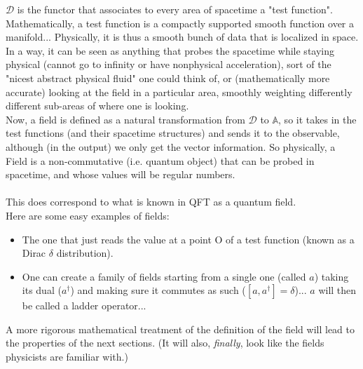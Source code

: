 \documentclass[a4paper,11pt]{article}
\numberwithin{equation}{section}
\theoremstyle{definition}
\begin{document}
$\mathcal{D}$ is the functor that associates to every area of spacetime a "test function". Mathematically, a test function is a compactly supported smooth function over a manifold... Physically, it is thus a smooth bunch of data that is localized in space. In a way, it can be seen as anything that probes the spacetime while staying physical (cannot go to infinity or have nonphysical acceleration), sort of the "nicest abstract physical fluid" one could think of, or (mathematically more accurate) looking at the field in a particular area, smoothly weighting differently different sub-areas of where one is looking.\\

Now, a field is defined as a natural transformation from $\mathcal{D}$ to $\mathbb{A}$, so it takes in the test functions (and their spacetime structures) and sends it to the observable, although (in the output) we only get the vector information. So physically, a Field is a non-commutative (i.e. quantum object) that can be probed in spacetime, and whose values will be regular numbers.\\ \\
This does correspond to what is known in QFT as a quantum field.\\

\noindent Here are some easy examples of fields:
\begin{itemize}
    \item The one that just reads the value at a point O of a test function (known as a Dirac $\delta$ distribution).
    \item One can create a family of fields starting from a single one (called $a$) taking its dual ($a^\dag$) and making sure it commutes as such ($[a,a^\dag]=\delta$)... $a$ will then be called a ladder operator...
\end{itemize}

A more rigorous mathematical treatment of the definition of the field will lead to the properties of the next sections. (It will also, \emph{finally}, look like the fields physicists are familiar with.)
\end{document}
